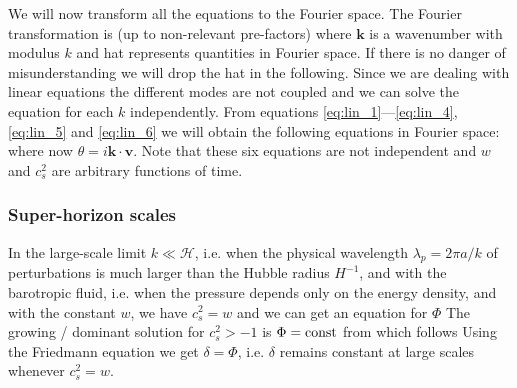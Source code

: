 We will now transform all the equations to the Fourier space. The Fourier transformation is (up to non-relevant pre-factors)
where $\bm k$ is a wavenumber with modulus $k$ and hat represents quantities in Fourier space. If there is no danger of misunderstanding we will drop the hat in the following. Since we are dealing with linear equations the different modes are not coupled and we can solve the equation for each $k$ independently.
 From equations \eqref{eq:lin_1}---\eqref{eq:lin_4}, \eqref{eq:lin_5} and \eqref{eq:lin_6} we will obtain the following equations in Fourier space:
where now $\theta=i\bm{k\cdot  v}$. Note that these six equations are not independent and $w$ and $c_s^2$ are arbitrary functions of time.
\subsubsection{Super-horizon scales}
In the large-scale limit $k\ll\mathcal{H}$, i.e. when the physical wavelength $\lambda_p=2\pi a/k$ of perturbations is much larger than the Hubble radius $H^{-1}$, and with the barotropic fluid, i.e. when the pressure depends only on the energy density, and with the constant $w$, we have $c_s^2=w$ and we can get an equation for $\Phi$
The growing / dominant solution for $c_s^2>-1$ is $\Phi=\rm{const}$ from which follows
Using the Friedmann equation we get $\delta=\Phi$, i.e. $\delta$ remains constant at large scales whenever $c_s^2=w$.
